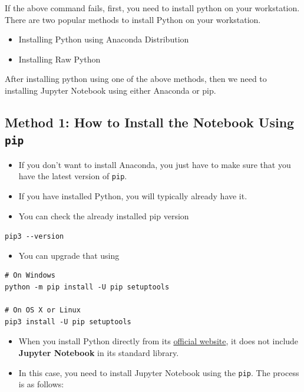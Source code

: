 \documentclass[
]{book}
\providecommand{\tightlist}{%
  \setlength{\itemsep}{0pt}\setlength{\parskip}{0pt}}
\begin{document}
If the above command fails, first, you need to install python on your workstation. There are two popular methods to install Python on your workstation.

\begin{itemize}
\tightlist
\item
  Installing Python using Anaconda Distribution
\item
  Installing Raw Python
\end{itemize}

After installing python using one of the above methods, then we need to installing Jupyter Notebook using either Anaconda or pip.

\hypertarget{method-1-how-to-install-the-notebook-using-pip}{%
\subsection{\texorpdfstring{Method 1: How to Install the Notebook Using \texttt{pip}}{Method 1: How to Install the Notebook Using pip}}\label{method-1-how-to-install-the-notebook-using-pip}}

\begin{itemize}
\tightlist
\item
  If you don't want to install Anaconda, you just have to make sure that you have the latest version of \texttt{pip}.
\item
  If you have installed Python, you will typically already have it.
\item
  You can check the already installed pip version
\end{itemize}

\texttt{pip3\ -\/-version}

\begin{itemize}
\tightlist
\item
  You can upgrade that using
\end{itemize}

\begin{verbatim}
# On Windows
python -m pip install -U pip setuptools

# On OS X or Linux
pip3 install -U pip setuptools
\end{verbatim}

\begin{itemize}
\tightlist
\item
  When you install Python directly from its \href{https://www.python.org/}{official website}, it does not include \textbf{Jupyter Notebook} in its standard library.
\item
  In this case, you need to install Jupyter Notebook using the \texttt{pip}. The process is as follows:
\end{itemize}
\end{document}
